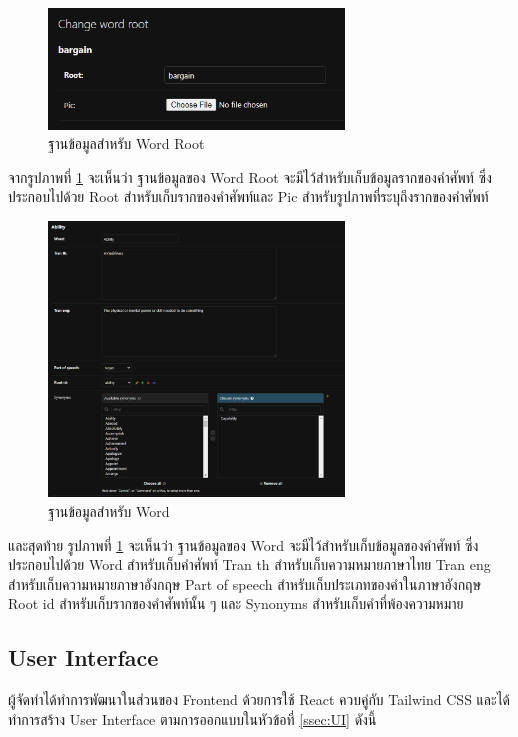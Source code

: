 \documentclass[12pt,oneside,openright,a4paper]{cpe-thai-project}
\begin{document}
\begin{figure}[!h]\centering
	\includegraphics[width=0.7\textwidth, keepaspectratio=true]{image/chap4/DB/word root.png}
	\caption{{ฐานข้อมูลสำหรับ Word Root}}\label{fig:chap4WordRoot}
\end{figure}
\hspace{1cm}
จากรูปภาพที่ \ref{fig:chap4WordRoot} จะเห็นว่า ฐานข้อมูลของ Word Root จะมีไว้สำหรับเก็บข้อมูลรากของคำศัพท์
ซึ่งประกอบไปด้วย Root สำหรับเก็บรากของคำศัพท์และ Pic สำหรับรูปภาพที่ระบุถึงรากของคำศัพท์

\pagebreak
\begin{figure}[!h]\centering
	\includegraphics[width=0.7\textwidth, keepaspectratio=true]{image/chap4/DB/word.png}
	\caption{{ฐานข้อมูลสำหรับ Word}}\label{fig:chap4Word}
\end{figure}
\hspace{1cm}
และสุดท้าย รูปภาพที่ \ref{fig:chap4WordRoot} จะเห็นว่า ฐานข้อมูลของ Word จะมีไว้สำหรับเก็บข้อมูลของคำศัพท์
ซึ่งประกอบไปด้วย Word สำหรับเก็บคำศัพท์ Tran th สำหรับเก็บความหมายภาษาไทย Tran eng สำหรับเก็บความหมายภาษาอังกฤษ
Part of speech สำหรับเก็บประเภทของคำในภาษาอังกฤษ Root id สำหรับเก็บรากของคำศัพท์นั้น ๆ และ Synonyms สำหรับเก็บคำที่พ้องความหมาย 

\pagebreak
\subsection{User Interface}
\hspace{1cm}
ผู้จัดทำได้ทำการพัฒนาในส่วนของ Frontend ด้วยการใช้ React ควบคู่กับ Tailwind CSS และได้ทำการสร้าง User Interface
ตามการออกแบบในหัวข้อที่ \ref{ssec:UI} ดังนี้
\end{document}
